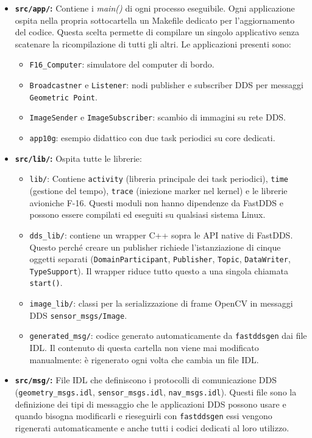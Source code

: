 \begin{itemize}
	\item \textbf{\texttt{src/app/}:} Contiene i \textit{main()} di ogni processo eseguibile. Ogni applicazione ospita nella propria sottocartella un Makefile dedicato per l'aggiornamento del codice. Questa scelta permette di compilare un singolo applicativo senza scatenare la ricompilazione di tutti gli altri. Le applicazioni presenti sono:
	\begin{itemize}
		\item \texttt{F16\_Computer}: simulatore del computer di bordo.
		\item \texttt{Broadcastner} e \texttt{Listener}: nodi publisher e subscriber DDS per messaggi  \texttt{Geometric Point}.
		\item \texttt{ImageSender} e \texttt{ImageSubscriber}: scambio di immagini su rete DDS.
		\item \texttt{app10g}: esempio didattico con due task periodici su core dedicati.
	\end{itemize}
	
	\item \textbf{\texttt{src/lib/}:} Ospita tutte le librerie:
	\begin{itemize}
		\item \texttt{lib/}: Contiene \texttt{activity} (libreria principale dei task periodici), \texttt{time} (gestione del tempo), \texttt{trace} (iniezione marker nel kernel) e le librerie avioniche F-16. Questi moduli non hanno dipendenze da FastDDS e possono essere compilati ed eseguiti su qualsiasi sistema Linux.
		\item \texttt{dds\_lib/}: contiene un wrapper C++ sopra le API native di FastDDS. Questo perché creare un publisher richiede l'istanziazione di cinque oggetti separati (\texttt{DomainParticipant}, \texttt{Publisher}, \texttt{Topic}, \texttt{DataWriter}, \texttt{TypeSupport}). Il wrapper riduce tutto questo a una singola chiamata \texttt{start()}.
		\item \texttt{image\_lib/}: classi per la serializzazione di frame OpenCV in messaggi DDS \texttt{sensor\_msgs/Image}.
		\item \texttt{generated\_msg/}: codice generato automaticamente da \texttt{fastddsgen} dai file IDL. Il contenuto di questa cartella non viene mai modificato manualmente: è rigenerato ogni volta che cambia un file IDL.
	\end{itemize}
	
	\item \textbf{\texttt{src/msg/}:} File IDL che definiscono i protocolli di comunicazione DDS (\texttt{geometry\_msgs.idl}, \texttt{sensor\_msgs.idl}, \texttt{nav\_msgs.idl}). Questi file sono la definizione dei tipi di messaggio che le applicazioni DDS possono usare e quando bisogna modificarli e rieseguirli con \texttt{fastddsgen} essi  vengono rigenerati automaticamente e anche tutti i codici dedicati al loro utilizzo.
	

\end{itemize}
